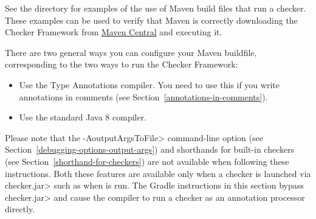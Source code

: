 See the directory  for examples of the use of
Maven build files that run a checker.  These examples can be used to verify that
Maven is correctly downloading the Checker Framework from
\href{http://search.maven.org/#search\%7Cga\%7C1\%7Corg.checkerframework}{Maven
  Central} and executing it.

There are two general ways you can configure your Maven buildfile,
corresponding to the two ways to run the Checker Framework:
\begin{itemize}
\item
  Use the Type Annotations compiler.  You need to use this if you write
  annotations in comments (see Section~\ref{annotations-in-comments}).
\item
  Use the standard Java 8 compiler.
\end{itemize}

Please note that the \<-AoutputArgsToFile> command-line option
(see Section~\ref{debugging-options-output-args}) and shorthands for built-in checkers
(see Section~\ref{shorthand-for-checkers}) are not available when
following these instructions.  Both these features are available only when a checker is
launched via \<checker.jar> such as when 
is run.  The Gradle instructions in this section
bypass \<checker.jar> and cause the compiler to run a
checker as an annotation processor directly.

